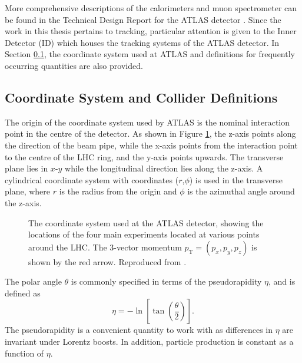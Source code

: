 More comprehensive descriptions of the calorimeters and muon spectrometer can be found in the Technical Design Report for the ATLAS detector \cite{inner-detector-TDR}. Since the work in this thesis pertains to tracking, particular attention is given to the Inner Detector (ID) which houses the tracking systems of the ATLAS detector. In Section \ref{coordinate-system}, the coordinate system used at ATLAS and definitions for frequently occurring quantities are also provided.



\subsection{Coordinate System and Collider Definitions}
\label{coordinate-system}


The origin of the coordinate system used by ATLAS is the nominal interaction point in the centre of the detector. As shown in Figure \ref{fig:atlas-coord-system}, the z-axis points along the direction of the beam pipe, while the x-axis points from the interaction point to the centre of the \ac{LHC} ring, and the y-axis points upwards.
The transverse plane lies in $x$-$y$ while the longitudinal direction lies along the z-axis. A cylindrical coordinate system with coordinates ($r$,$\phi$) is used in the transverse plane, where $r$ is the radius from the origin and $\phi$ is the azimuthal angle around the z-axis.

\begin{figure}[!htbp]
  \centering
  
  \caption{
    The coordinate system used at the ATLAS detector, showing the locations of the four main experiments located at various points around the \ac{LHC}. The 3-vector momentum $p_{\text{T}} = (p_x, p_y, p_z)$ is shown by the red arrow. Reproduced from \cite{Strong:2020mge}.
  }
  \label{fig:atlas-coord-system}
\end{figure}


The polar angle $\theta$ is commonly specified in terms of the pseudorapidity $\eta$, and is defined as
%
\begin{equation}\label{eq:pseudorap}
  \eta = - \ln \left[ \tan \left( \frac{\theta}{2} \right) \right] .
\end{equation}
%
The pseudorapidity is a convenient quantity to work with as differences in $\eta$ are invariant under Lorentz boosts. In addition, particle production is constant as a function of $\eta$.


